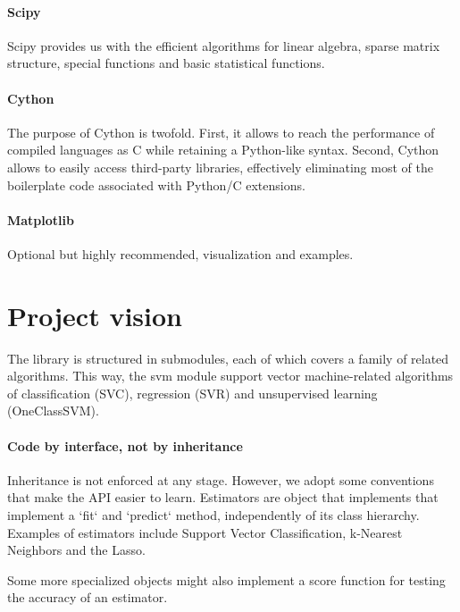 \documentclass[twoside,11pt]{article}
\begin{document}
\paragraph{Scipy} 

Scipy provides us with the efficient algorithms for linear algebra,
sparse matrix structure, special functions and basic statistical
functions.

\paragraph{Cython}

The purpose of Cython is twofold. First, it allows to reach the
performance of compiled languages as C while retaining a Python-like
syntax. Second, Cython allows to easily access third-party libraries,
effectively eliminating most of the boilerplate code associated with
Python/C extensions.

\paragraph{Matplotlib}

Optional but highly recommended, visualization and examples.



\section {Project vision}


The library is structured in submodules, each of which covers a family
of related algorithms. This way, the svm module support vector
machine-related algorithms of classification (SVC), regression (SVR)
and unsupervised learning (OneClassSVM).


\paragraph{Code by interface, not by inheritance}

Inheritance is not enforced at any stage. However, we adopt some
conventions that make the API easier to learn. Estimators are object
that implements that implement a `fit` and `predict` method,
independently of its class hierarchy. Examples of estimators include
Support Vector Classification, k-Nearest Neighbors and the Lasso.

Some more specialized objects might also implement a score function
for testing the accuracy of an estimator.
\end{document}
